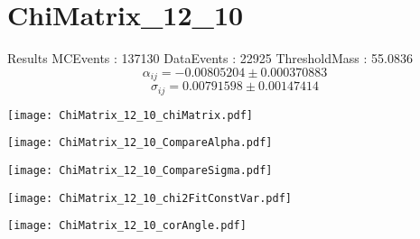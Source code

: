 \documentclass[a4paper,12pt]{article}
\begin{document}
\section{ChiMatrix\_12\_10}
\begin{minipage}{0.49\linewidth} Results \newline
MCEvents : 137130\newline
DataEvents : 22925 \newline
ThresholdMass : 55.0836\\
$$\alpha_{ij} = -0.00805204\pm 0.000370883$$
$$\sigma_{ij} = 0.00791598\pm 0.00147414$$
\end{minipage}\hfill
\begin{minipage}{0.49\linewidth} 
\texttt{[image: ChiMatrix\_12\_10\_chiMatrix.pdf]}\\
\end{minipage}
\hfill
\begin{minipage}{0.49\linewidth} 
\texttt{[image: ChiMatrix\_12\_10\_CompareAlpha.pdf]}\\
\end{minipage}
\hfill
\begin{minipage}{0.49\linewidth} 
\texttt{[image: ChiMatrix\_12\_10\_CompareSigma.pdf]}\\
\end{minipage}
\begin{minipage}{0.49\linewidth} 
\texttt{[image: ChiMatrix\_12\_10\_chi2FitConstVar.pdf]}\\
\end{minipage}
\hfill
\begin{minipage}{0.49\linewidth} 
\texttt{[image: ChiMatrix\_12\_10\_corAngle.pdf]}\\
\end{minipage}
\end{document}
